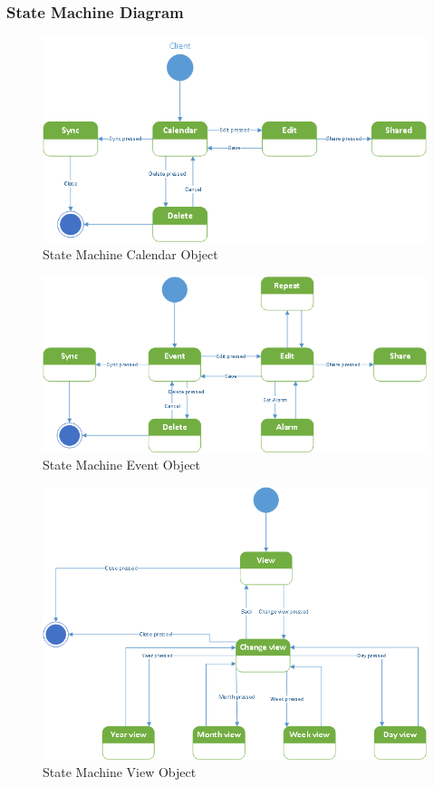 \newpage
\subsubsection*{State Machine Diagram}
\begin{figure}[ht!]
\centering
\includegraphics[width=160mm]{calendar.png}
\caption{State Machine Calendar Object  \label{overflow}}
\end{figure}

\begin{figure}[ht!]
\centering
\includegraphics[width=160mm]{event.png}
\caption{State Machine Event Object \label{overflow}}
\end{figure}

\newpage
\begin{figure}[ht!]
\centering
\includegraphics[width=160mm]{view.png}
\caption{State Machine View Object  \label{overflow}}
\end{figure}



